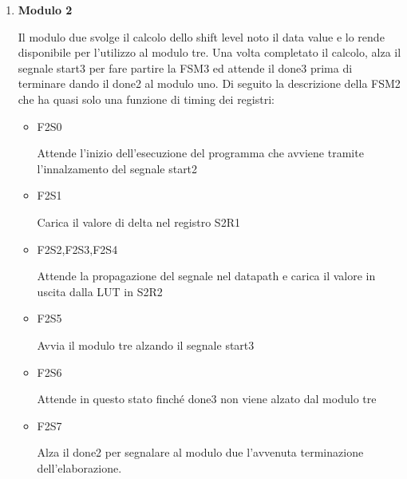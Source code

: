 \documentclass{article}
\begin{document}
\begin{enumerate}
    \item \textbf{Modulo 2}
		
		Il modulo due svolge il calcolo dello shift level noto il data value e lo rende disponibile per l'utilizzo al modulo tre. Una volta completato il calcolo, alza il segnale start3 per fare partire la FSM3 ed attende il done3 prima di terminare dando il done2 al modulo uno. Di seguito la descrizione della FSM2 che ha quasi solo una funzione di timing dei registri:
			\begin{itemize}
				\item F2S0 
				
				Attende l'inizio dell'esecuzione del programma che avviene tramite l'innalzamento del segnale start2
				
				\item F2S1
				
				Carica il valore di delta nel registro S2R1
				
				\item F2S2,F2S3,F2S4
				
				Attende la propagazione del segnale nel datapath e carica il valore in uscita dalla LUT in S2R2
				
				\item F2S5
				
				Avvia il modulo tre alzando il segnale start3
				
				\item F2S6
				
				Attende in questo stato finché done3 non viene alzato dal modulo tre
				\item F2S7
				
				Alza il done2 per segnalare al modulo due l'avvenuta terminazione dell'elaborazione.
				
				
			\end{itemize}


\end{enumerate}
\end{document}
